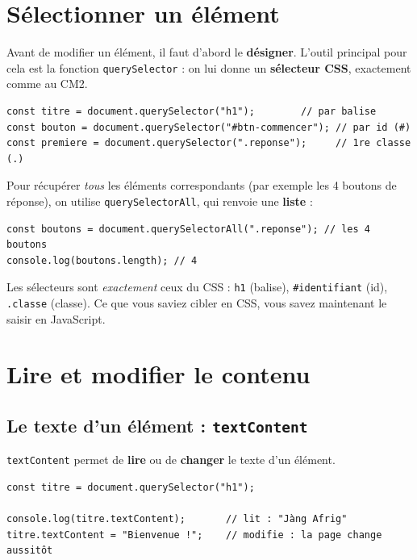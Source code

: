 \documentclass[11pt,a4paper]{article}
\newcommand{\code}[1]{\texttt{#1}}
\begin{document}
\section{Sélectionner un élément}

Avant de modifier un élément, il faut d'abord le \textbf{désigner}. L'outil principal pour cela est la fonction \code{querySelector} : on lui donne un \textbf{sélecteur CSS}, exactement comme au CM2.

\begin{lstlisting}[style=js]
const titre = document.querySelector("h1");        // par balise
const bouton = document.querySelector("#btn-commencer"); // par id (#)
const premiere = document.querySelector(".reponse");     // 1re classe (.)
\end{lstlisting}

Pour récupérer \emph{tous} les éléments correspondants (par exemple les 4 boutons de réponse), on utilise \code{querySelectorAll}, qui renvoie une \textbf{liste} :

\begin{lstlisting}[style=js]
const boutons = document.querySelectorAll(".reponse"); // les 4 boutons
console.log(boutons.length); // 4
\end{lstlisting}

\begin{retenirbox}
Les sélecteurs sont \emph{exactement} ceux du CSS : \code{h1} (balise), \code{\#identifiant} (id), \code{.classe} (classe). Ce que vous saviez cibler en CSS, vous savez maintenant le saisir en JavaScript.
\end{retenirbox}

\section{Lire et modifier le contenu}

\subsection{Le texte d'un élément : \texttt{textContent}}
\code{textContent} permet de \textbf{lire} ou de \textbf{changer} le texte d'un élément.

\begin{lstlisting}[style=js]
const titre = document.querySelector("h1");

console.log(titre.textContent);       // lit : "Jàng Afrig"
titre.textContent = "Bienvenue !";    // modifie : la page change aussitôt
\end{lstlisting}
\end{document}
